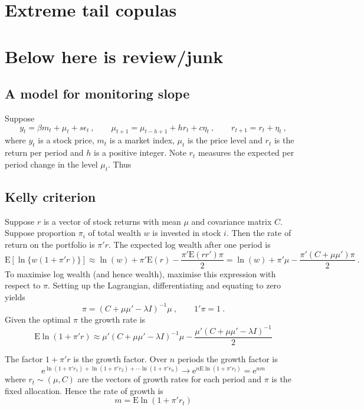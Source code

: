 \documentclass[authoryear]{elsarticle}
\newcommand{\E}{\mathrm{E}}
\newcommand{\e}{\mathrm{e}}
\newcommand{\eps}{\epsilon}
\newcommand{\cq}{\ , \qquad}
\newcommand{\be}[1]{\begin{equation}\label{#1}}
\newcommand{\ee}{\end{equation}}
\begin{document}
\section{Extreme tail copulas} 
 

\section{Below here is review/junk}

\subsection{A  model for monitoring slope}
Suppose
\be{slope}
y_t = \beta m_t + \mu_t + s\eps_t\cq \mu_{t+1} = \mu_{t-h+1} + hr_t + c\eta_t \cq r_{t+1}=r_t + \eta_t\ ,
\ee
where $y_t$ is a stock price,  $m_t$ is a market index, $\mu_t$ is the price level and $r_t$ is the return per period and $h$ is a positive  integer.   Note $r_t$ measures  the expected  per period change in the level $\mu_t$.   Thus

\subsection{Kelly criterion}

Suppose $r$ is a vector of stock returns with mean $\mu$ and covariance matrix $C$.    Suppose proportion $\pi_i$ of total wealth $w$  is invested in stock $i$.  Then the rate of return on the portfolio is 
$ \pi'r$.   The expected  log wealth after one period   is 
$$
\E[\ln \{w(1+\pi' r)\}] \approx \ln(w) + \pi'\E(r) -\frac{\pi'\E(rr')\pi}{2} =  \ln(w) + \pi'\mu -\frac{\pi'(C+\mu\mu')\pi}{2}\ .
$$ 
To maximise log wealth (and hence wealth), maximise this expression with respect to $\pi$.   Setting up the Lagrangian, differentiating and equating to zero yields 
$$
\pi = (C+\mu\mu' - \lambda I)^{-1}\mu\cq 1'\pi=1\ .
$$
Given the optimal $\pi$ the growth rate is 
$$
\E\ln(1+\pi'r) \approx \mu'(C+\mu\mu' - \lambda I)^{-1}\mu - \frac{\mu'(C+\mu\mu' - \lambda I)^{-1}}{2}
$$

The factor $1+\pi'r$ is the growth factor.   Over $n$ periods the growth factor is
$$
\e^{\ln(1+\pi'r_1)+\ln(1+\pi'r_2)+\cdots \ln(1+\pi'r_n)} \rightarrow \e^{n\E\ln(1+ \pi'r_t)} = \e^{nm}
$$
where $r_t\sim(\mu,C)$ are the vectors of growth rates for each period and $\pi$ is the fixed allocation.   Hence the rate of growth is
$$
m=\E\ln(1+\pi'r_t) 
$$
\end{document}
